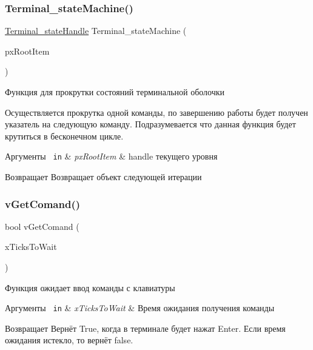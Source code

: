 \subsubsection{\texorpdfstring{Terminal\_stateMachine()}{Terminal\_stateMachine()}}
{\footnotesize\ttfamily \mbox{\hyperlink{group__terminal_gadcd4acb437149111c071e40bccbac72a}{Terminal\+\_\+state\+Handle}} Terminal\+\_\+state\+Machine (\begin{DoxyParamCaption}\item[{\mbox{\hyperlink{group__terminal_gadcd4acb437149111c071e40bccbac72a}{Terminal\+\_\+state\+Handle}}}]{px\+Root\+Item }\end{DoxyParamCaption})}



Функция для прокрутки состояний терминальной оболочки 

Осуществляется прокрутка одной команды, по завершению работы будет получен указатель на следующую команду. Подразумевается что данная функция будет крутиться в бесконечном цикле. 
\begin{DoxyParams}[1]{Аргументы}
\mbox{\texttt{ in}}  & {\em px\+Root\+Item} & handle текущего уровня \\
\hline
\end{DoxyParams}
\begin{DoxyReturn}{Возвращает}
Возвращает объект следующей итерации 
\end{DoxyReturn}
\mbox{\label{group__terminal_gac9891fc8397e8a100f20698722ab1e71}} 
\subsubsection{\texorpdfstring{vGetComand()}{vGetComand()}}
{\footnotesize\ttfamily bool v\+Get\+Comand (\begin{DoxyParamCaption}\item[{Tick\+Type\+\_\+t}]{x\+Ticks\+To\+Wait }\end{DoxyParamCaption})}



Функция ожидает ввод команды с клавиатуры 


\begin{DoxyParams}[1]{Аргументы}
\mbox{\texttt{ in}}  & {\em x\+Ticks\+To\+Wait} & Время ожидания получения команды \\
\hline
\end{DoxyParams}
\begin{DoxyReturn}{Возвращает}
Вернёт True, когда в терминале будет нажат Enter. Если время ожидания истекло, то вернёт false. 
\end{DoxyReturn}
